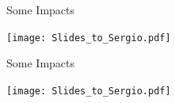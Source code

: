 \documentclass[10pt,t]{beamer}
\begin{document}

\begin{frame}{Some Impacts}
\vspace{-0.35in}
\begin{center}
\texttt{[image: Slides\_to\_Sergio.pdf]}
\end{center}
\end{frame}

\begin{frame}{Some Impacts}
\vspace{-0.35in}
\begin{center}
\texttt{[image: Slides\_to\_Sergio.pdf]}
\end{center}
\end{frame}

\end{document}

